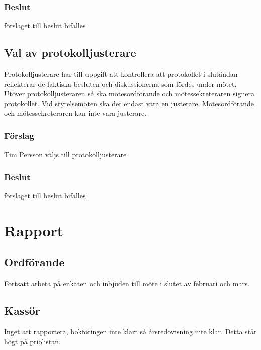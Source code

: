 \documentclass[protokoll]{dvd}
\begin{document}
\subsubsection*{Beslut}
\begin{attsatser}
    \item förslaget till beslut bifalles
\end{attsatser}

\subsection{Val av protokolljusterare}

Protokolljusterare har till uppgift att kontrollera att protokollet i slutändan reflekterar de faktiska besluten och diskussionerna som fördes under mötet.
Utöver protokolljusteraren så ska mötesordförande och mötessekreteraren signera protokollet.
Vid styrelsemöten ska det endast vara en justerare.
Mötesordförande och mötessekreteraren kan inte vara justerare.

\subsubsection*{Förslag}
\begin{attsatser}
    \item Tim Persson väljs till protokolljusterare
\end{attsatser}
\subsubsection*{Beslut}
\begin{attsatser}
    \item förslaget till beslut bifalles
\end{attsatser}

\section{Rapport}
\subsection{Ordförande}
Fortsatt arbeta på enkäten och inbjuden till möte i slutet av februari och mars.

\subsection{Kassör}
Inget att rapportera, bokföringen inte klart så årsredovisning inte klar. Detta står högt på priolistan.
\end{document}
